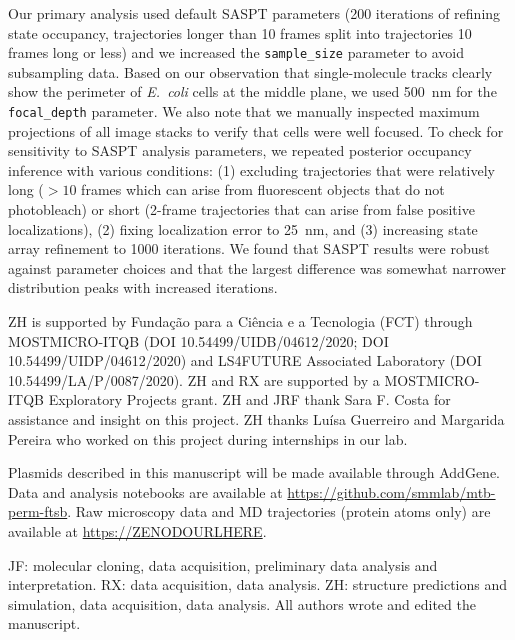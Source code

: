 \documentclass[twocolumn,pdflatex,sn-nature]{sn-jnl}%
\newcommand\ec{\textit{E.~coli}}
\begin{document}
Our primary analysis used default SASPT parameters (200 iterations of refining state occupancy, trajectories longer than 10 frames split into trajectories 10 frames long or less) and we increased the \verb|sample_size| parameter to avoid subsampling data.
Based on our observation that single-molecule tracks clearly show the perimeter of \ec{} cells at the middle plane, we used \qty{500}{\nm} for the \verb|focal_depth| parameter.
We also note that we manually inspected maximum projections of all image stacks to verify that cells were well focused.
To check for sensitivity to SASPT analysis parameters, we repeated posterior occupancy inference with various conditions: (1) excluding trajectories that were relatively long ($>10$ frames which can arise from fluorescent objects that do not photobleach) or short (2-frame trajectories that can arise from false positive localizations), (2) fixing localization error to \qty{25}{\nm}, and (3) increasing state array refinement to \num{1000} iterations.
We found that SASPT results were robust against parameter choices and that the largest difference was somewhat narrower distribution peaks with increased iterations.

\backmatter


ZH is supported by Fundação para a Ciência e a Tecnologia (FCT) through MOSTMICRO-ITQB (DOI 10.54499/UIDB/04612/2020; DOI 10.54499/UIDP/04612/2020) and LS4FUTURE Associated Laboratory (DOI 10.54499/LA/P/0087/2020).
ZH and RX are supported by a MOSTMICRO-ITQB Exploratory Projects grant.
ZH and JRF thank Sara F. Costa for assistance and insight on this project.
ZH thanks Luísa Guerreiro and Margarida Pereira who worked on this project during internships in our lab.


Plasmids described in this manuscript will be made available through AddGene.
Data and analysis notebooks are available at \url{https://github.com/smmlab/mtb-perm-ftsb}.
Raw microscopy data and MD trajectories (protein atoms only) are available at \url{https://ZENODOURLHERE}.


JF: molecular cloning, data acquisition, preliminary data analysis and interpretation. RX: data acquisition, data analysis. ZH: structure predictions and simulation, data acquisition, data analysis. All authors wrote and edited the manuscript.

\end{document}
